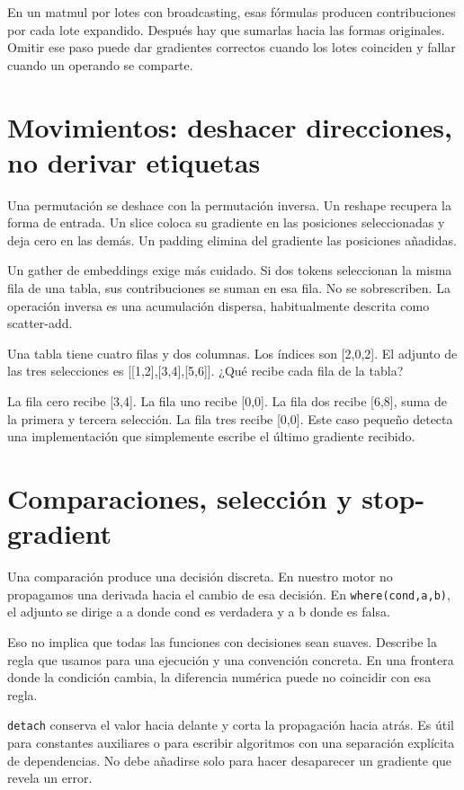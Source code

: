 \documentclass[12pt,a4paper,oneside]{report}
\begin{document}
En un matmul por lotes con broadcasting, esas fórmulas producen contribuciones por cada lote expandido. Después hay que sumarlas hacia las formas originales. Omitir ese paso puede dar gradientes correctos cuando los lotes coinciden y fallar cuando un operando se comparte.

\section{Movimientos: deshacer direcciones, no derivar etiquetas}
Una permutación se deshace con la permutación inversa. Un reshape recupera la forma de entrada. Un slice coloca su gradiente en las posiciones seleccionadas y deja cero en las demás. Un padding elimina del gradiente las posiciones añadidas.

Un gather de embeddings exige más cuidado. Si dos tokens seleccionan la misma fila de una tabla, sus contribuciones se suman en esa fila. No se sobrescriben. La operación inversa es una acumulación dispersa, habitualmente descrita como scatter-add.

\begin{practica}
Una tabla tiene cuatro filas y dos columnas. Los índices son [2,0,2]. El adjunto de las tres selecciones es [[1,2],[3,4],[5,6]]. ¿Qué recibe cada fila de la tabla?

\end{practica}
La fila cero recibe [3,4]. La fila uno recibe [0,0]. La fila dos recibe [6,8], suma de la primera y tercera selección. La fila tres recibe [0,0]. Este caso pequeño detecta una implementación que simplemente escribe el último gradiente recibido.

\section{Comparaciones, selección y stop-gradient}
Una comparación produce una decisión discreta. En nuestro motor no propagamos una derivada hacia el cambio de esa decisión. En \texttt{where(cond,a,b)}, el adjunto se dirige a a donde cond es verdadera y a b donde es falsa.

Eso no implica que todas las funciones con decisiones sean suaves. Describe la regla que usamos para una ejecución y una convención concreta. En una frontera donde la condición cambia, la diferencia numérica puede no coincidir con esa regla.

\texttt{detach} conserva el valor hacia delante y corta la propagación hacia atrás. Es útil para constantes auxiliares o para escribir algoritmos con una separación explícita de dependencias. No debe añadirse solo para hacer desaparecer un gradiente que revela un error.
\end{document}
